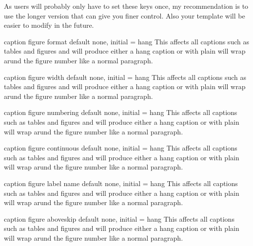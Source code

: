As users will probably only have to set these keys once, my recommendation is to use the longer version that can give you finer control. Also your template will be easier to modify in the future.
\medskip


\begin{docKey}{caption figure format}{ } {default none, initial = hang}
  This affects all captions such as tables and figures and will produce either 
  a hang caption or   with plain will wrap arund the figure number like a normal paragraph.
\end{docKey}

\begin{docKey}{caption figure width}{ } {default none, initial = hang}
  This affects all captions such as tables and figures and will produce either 
  a hang caption or   with plain will wrap arund the figure number like a normal paragraph.
\end{docKey}

\begin{docKey}{caption figure numbering}{ } {default none, initial = hang}
  This affects all captions such as tables and figures and will produce either 
  a hang caption or   with plain will wrap arund the figure number like a normal paragraph.
\end{docKey}

\begin{docKey}{caption figure continuous}{ } {default none, initial = hang}
  This affects all captions such as tables and figures and will produce either 
  a hang caption or   with plain will wrap arund the figure number like a normal paragraph.
\end{docKey}

\begin{docKey}{caption figure label name}{ } {default none, initial = hang}
  This affects all captions such as tables and figures and will produce either 
  a hang caption or   with plain will wrap arund the figure number like a normal paragraph.
\end{docKey}

\begin{docKey}{caption figure aboveskip}{ } {default none, initial = hang}
  This affects all captions such as tables and figures and will produce either 
  a hang caption or   with plain will wrap arund the figure number like a normal paragraph.
\end{docKey}

